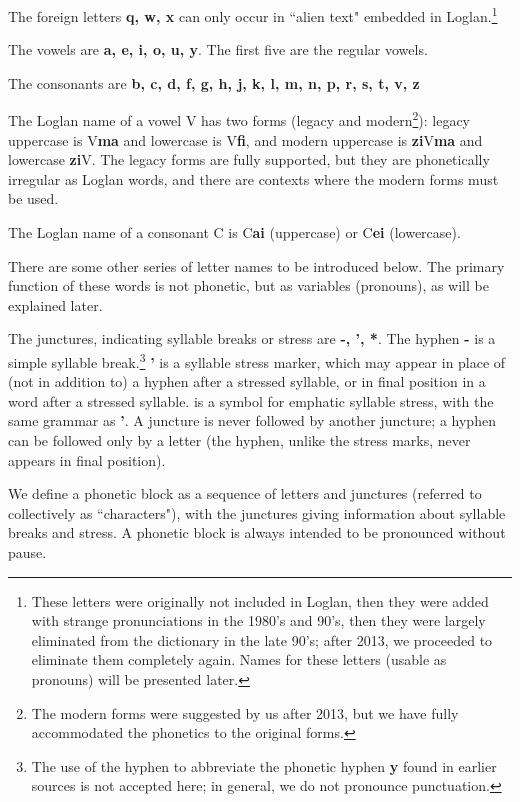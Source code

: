 \documentclass[12pt]{book}
\begin{document}
 The foreign letters {\bf q, w, x} can only occur in ``alien text" embedded in Loglan.\footnote{These letters were originally not included in Loglan, then they were added with strange pronunciations in the 1980's and 90's, then they were largely eliminated from the dictionary in the late 90's;  after 2013, we proceeded to eliminate them completely again.   Names for these letters (usable as pronouns) will be presented later.}

The vowels are {\bf a, e, i, o, u, y}.  The first five are the regular vowels.

The consonants are   {\bf b, c, d, f, g, h, j, k, l, m, n, p, r, s, t, v, z}

The Loglan name of a vowel V has two forms (legacy and modern\footnote{The modern forms were suggested by us after 2013, but we have fully accommodated the phonetics to the original forms.}):  legacy uppercase is V{\bf ma} and lowercase is V{\bf fi}, and modern uppercase is {\bf zi}V{\bf ma} and lowercase {\bf zi}V.  The legacy forms are fully supported, but they are phonetically irregular as Loglan words, and there are contexts where the modern forms must be used.

The Loglan name of a consonant C is C{\bf ai} (uppercase) or C{\bf ei} (lowercase).

There are some other series of letter names to be introduced below.  The primary function of these words is not phonetic, but as variables (pronouns), as will be explained later.

The junctures, indicating syllable breaks or stress are {\bf -, ', *}.  The hyphen {\bf -} is a simple syllable break.\footnote{The use of the hyphen to abbreviate the phonetic hyphen {\bf y} found in earlier sources is not accepted here;  in general, we do not pronounce punctuation.}  {\bf '} is a syllable stress marker, which may appear in place of (not in addition to) a hyphen after a stressed syllable, or in final position in a word after a stressed syllable.  {\bf *} is a symbol for emphatic syllable stress, with the same grammar as {\bf '}.  A juncture is never followed by another juncture;  a hyphen can be followed only by a letter (the hyphen, unlike the stress marks, never appears in final position).

We define a phonetic block as a sequence of  letters and junctures (referred to collectively as ``characters"), with the junctures giving information about syllable breaks and stress.  A phonetic block is always intended to be pronounced without pause.
\end{document}
